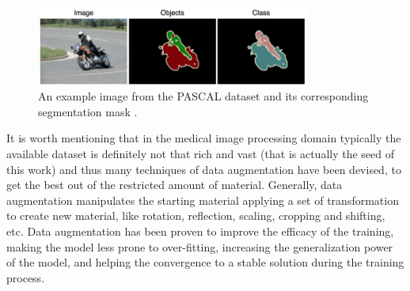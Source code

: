     \begin{figure}
        \centering
        \includegraphics[width = 0.8\textwidth]{images/PASCAL}
        \caption{An example image from the PASCAL dataset and its corresponding segmentation mask \cite{PASCAL}.}
        \label{fig:PASCAL}
    \end{figure}

It is worth mentioning that in the medical image processing domain typically the available dataset is definitely not that rich and vast (that is actually the seed of this work) and thus many techniques of data augmentation have been devised, to get the best out of the restricted amount of material. Generally, data augmentation manipulates the starting material applying a set of transformation to create new material, like rotation, reflection, scaling, cropping and shifting, etc. Data augmentation has been proven to improve the efficacy of the training, making the model less prone to over-fitting, increasing the generalization power of the model, and helping the convergence to a stable solution during the training process.
